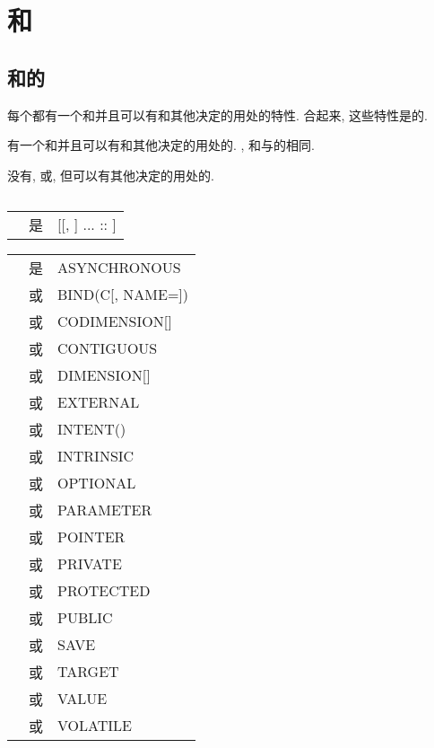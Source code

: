 \chapter{\Attribute{}\Declaration{}和\Specification{}}

\section{\Procedure{}和\Data{}\Object{}的\Attribute{}}

每个\Data{}\Object{}都有一个\Type{}和\Rank{}并且可以有\TypeParameter{}和其他决定\Object{}的用处的特性. 合起来, 这些特性是\Object{}的\Attribute{}.

\Function{}有一个\Type{}和\Rank{}并且可以有\TypeParameter{}和其他决定\Function{}的用处的\Attribute{}. \Type{}, \Rank{}和\TypeParameter{}与\Function{}\Result{}的相同.

\Subroutine{}没有\Type{}, \Rank{}或\TypeParameter{}, 但可以有其他决定\Subroutine{}的用处的\Attribute{}.

\section{\Type{}\Declaration{}\Statement{}}

\begin{tabular}{lll}
    \tit{\Type{}\Declaration{}\Statement{}}&是&\tit{\Declaration{}\Type{}\Specification{}}[[, \tit{\Attribute{}\Specification{}}] ... :: ] \tit{\Entity{}\Declaration{}\List{}}\\
\end{tabular}

\begin{tabular}{lll}
    \tit{\Attribute{}\Specification{}}&是&ASYNCHRONOUS\\
    &或&BIND(C[, NAME=\tit{\Scalar{}\Default{}\Character{}\Constant{}\Expression{}}])\\
    &或&CODIMENSION[\tit{\Coarray{}\Specification{}}]\\
    &或&CONTIGUOUS\\
    &或&DIMENSION[\tit{\Array{}\Specification{}}]\\
    &或&EXTERNAL\\
    &或&INTENT(\tit{\Intent{}\Specification{}})\\
    &或&INTRINSIC\\
    &或&OPTIONAL\\
    &或&PARAMETER\\
    &或&POINTER\\
    &或&PRIVATE\\
    &或&PROTECTED\\
    &或&PUBLIC\\
    &或&SAVE\\
    &或&TARGET\\
    &或&VALUE\\
    &或&VOLATILE\\
\end{tabular}

